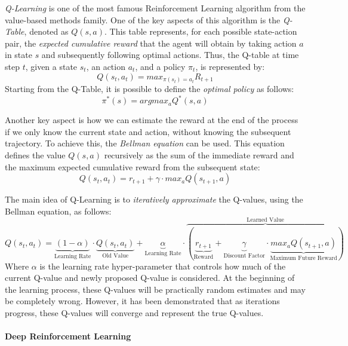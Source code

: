 \documentclass[12pt,a4paper,openright,twoside]{book}
\begin{document}
\emph{Q-Learning} is one of the most famous Reinforcement Learning algorithm from the value-based methods family. 
    One of the key aspects of this algorithm is the \emph{Q-Table}, denoted as $Q(s,a)$. This table represents, 
    for each possible state-action pair, the \emph{expected cumulative reward} that the agent will obtain by
    taking action $a$ in state $s$ and subsequently following optimal actions. 
    Thus, the Q-table at time step $t$, given a state $s_t$, an action $a_t$, and a policy $\pi_t$, is represented by:
    $$ Q(s_t, a_t) = max_{\pi(s_t) = a_t} R_{t+1}$$
    Starting from the Q-Table, it is possible to define the \emph{optimal policy} as follows:
    $$ \pi^{*}(s) = argmax_a Q^{*}(s,a) $$

Another key aspect is how we can estimate the reward at the end of the process if we only know the current state 
    and action, without knowing the subsequent trajectory. To achieve this, the \emph{Bellman equation} can be used. 
    This equation defines the value $Q(s,a)$ recursively 
    as the sum of the immediate reward and the maximum expected cumulative reward from the subsequent state:
    $$ Q(s_t,a_t) =  r_{t+1} + \gamma \cdot max_a Q(s_{t+1}, a)$$

The main idea of Q-Learning is to \emph{iteratively approximate} the Q-values, using the Bellman equation, as follows:
\[
Q(s_t,a_t) = 
    \underbrace{
        (1-\alpha) 
    }_\text{Learning Rate}   
    \cdot 
    \underbrace{
        Q(s_t,a_t) 
    }_\text{Old Value}
    + 
    \underbrace{
        \alpha
    }_\text{Learning Rate}
    \cdot 
    \overbrace{
        (
        \underbrace{
            r_{t+1}
        }_\text{Reward}
        + 
        \underbrace{
            \gamma
        }_\text{Discount Factor}
        \cdot 
        \underbrace{
        max_a Q(s_{t+1}, a)
        }_\text{Maximum Future Reward}
        )
    }^\text{Learned Value}
\]
    Where $\alpha$ is the learning rate hyper-parameter that controls how much of the current Q-value and newly proposed
    Q-value is considered.
    At the beginning of the learning process, these Q-values will be practically random estimates and may be completely wrong. 
    However, it has been demonstrated that as iterations progress, these Q-values will 
    converge and represent the true Q-values.

\paragraph{Deep Reinforcement Learning}
\end{document}
